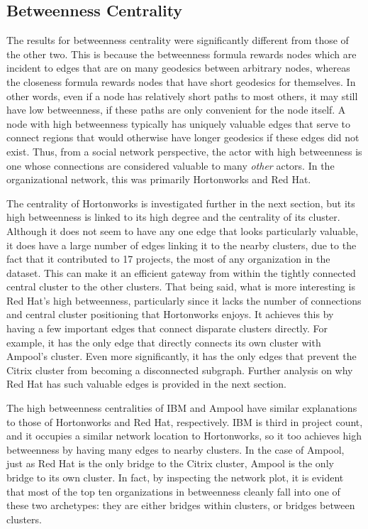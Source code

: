\subsection{Betweenness Centrality}
The results for betweenness centrality were significantly different from those of the other two. This is because the betweenness formula rewards nodes which are incident to edges that are on many geodesics between arbitrary nodes, whereas the closeness formula rewards nodes that have short geodesics for themselves. In other words, even if a node has relatively short paths to most others, it may still have low betweenness, if these paths are only convenient for the node itself. A node with high betweenness typically has uniquely valuable edges that serve to connect regions that would otherwise have longer geodesics if these edges did not exist. Thus, from a social network perspective, the actor with high betweenness is one whose connections are considered valuable to many \textit{other} actors. In the organizational network, this was primarily Hortonworks and Red Hat.

The centrality of Hortonworks is investigated further in the next section, but its high betweenness is linked to its high degree and the centrality of its cluster. Although it does not seem to have any one edge that looks particularly valuable, it does have a large number of edges linking it to the nearby clusters, due to the fact that it contributed to 17 projects, the most of any organization in the dataset. This can make it an efficient gateway from within the tightly connected central cluster to the other clusters. That being said, what is more interesting is Red Hat's high betweenness, particularly since it lacks the number of connections and central cluster positioning that Hortonworks enjoys. It achieves this by having a few important edges that connect disparate clusters directly. For example, it has the only edge that directly connects its own cluster with Ampool's cluster. Even more significantly, it has the only edges that prevent the Citrix cluster from becoming a disconnected subgraph. Further analysis on why Red Hat has such valuable edges is provided in the next section.

The high betweenness centralities of IBM and Ampool have similar explanations to those of Hortonworks and Red Hat, respectively. IBM is third in project count, and it occupies a similar network location to Hortonworks, so it too achieves high betweenness by having many edges to nearby clusters. In the case of Ampool, just as Red Hat is the only bridge to the Citrix cluster, Ampool is the only bridge to its own cluster. In fact, by inspecting the network plot, it is evident that most of the top ten organizations in betweenness cleanly fall into one of these two archetypes: they are either bridges within clusters, or bridges between clusters.


